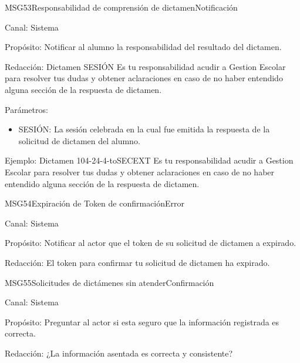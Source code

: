 \begin{mensaje}{MSG53}{Responsabilidad de comprensión de dictamen}{Notificación}
	\item[Canal:] Sistema
	\item[Propósito:] Notificar al alumno la responsabilidad del resultado del dictamen.
	\item[Redacción:] Dictamen SESIÓN  Es tu responsabilidad acudir a Gestion Escolar para resolver tus dudas y obtener aclaraciones en caso de no haber entendido alguna sección de la respuesta de dictamen.
	\item[Parámetros:] 
	\begin{itemize}
		\item SESIÓN: La sesión celebrada en la cual fue emitida la respuesta de la solicitud de dictamen del alumno.
	\end{itemize}
	\item[Ejemplo:]	Dictamen 104-24-4-toSECEXT  Es tu responsabilidad acudir a Gestion Escolar para resolver tus dudas y obtener aclaraciones en caso de no haber entendido alguna sección de la respuesta de dictamen.
	
\end{mensaje}

\begin{mensaje}{MSG54}{Expiración de Token de confirmación}{Error}
	\item[Canal:] Sistema
	\item[Propósito:] Notificar al actor que el token de su solicitud de dictamen a expirado.
	\item[Redacción:] El token para confirmar tu solicitud de dictamen ha expirado.
	
\end{mensaje}

\begin{mensaje}{MSG55}{Solicitudes de dictámenes sin atender}{Confirmación}
	\item[Canal:] Sistema
	\item[Propósito:] Preguntar al actor si esta seguro que la información registrada es correcta.
	\item[Redacción:] ¿La información asentada es correcta y consistente?
	
\end{mensaje}


